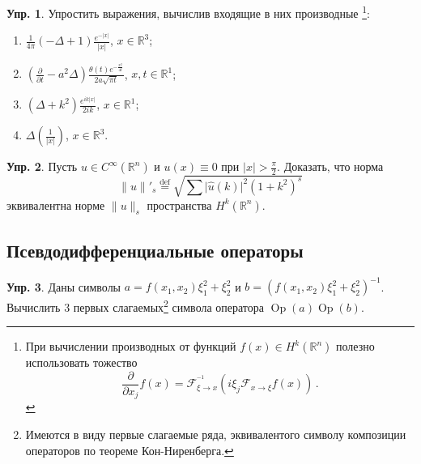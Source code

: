 \documentclass[a4paper, 12pt]{article}
\theoremstyle{definition}
\newtheorem{exercise}{Упр.}
\begin{document}
\begin{exercise} %
    Упростить выражения, вычислив входящие в них производные
    \footnote{При вычислении производных от функций \({ f(x) \in H^{k}(\mathbb R^{n}) }\) полезно использовать тожество \[
        \frac{\partial}{\partial x_j} f(x) = \mathcal F^{^{-1}}_{\xi \to x} (i\xi_{j} \mathcal F_{x \to \xi}f(x))\,.
    \]}:
    \begin{enumerate}
        \item \({ \displaystyle \frac{1}{4\pi} (- \Delta + 1) \frac{e^{-\lvert x \rvert}}{\lvert x \rvert} }\), \({ x \in \mathbb R^3 }\); \\
        \item \({ \displaystyle \left( \frac{\partial}{\partial t} - a^2 \Delta \right) \frac{\theta(t) e^{-\frac{x^2}{4t}}}{2a \sqrt{\pi t}} }\), \({ x, t \in \mathbb R^{1} }\); \\
        \item \({ \displaystyle (\Delta + k^2) \frac{e^{ik \lvert x \rvert}}{2ik} }\), \({ x \in \mathbb R^{1} }\);
        \item \({ \displaystyle \Delta\left( \frac{1}{\lvert x \rvert} \right) }\), \({ x \in \mathbb R^3 }\).
    \end{enumerate}
\end{exercise}

\begin{exercise}
    Пусть \({ u \in C^{\infty}(\mathbb R^{n}) }\) и \({ u(x) \equiv 0 }\) при \({ \lvert x \rvert > \frac{\pi}{2} }\).
    Доказать, что норма \[
        \lVert u \rVert'_{s} \overset{\text{def}}= \sqrt{\sum \lvert \hat{u}(k) \rvert^2 (1 + k^2)^{s}}
    \] эквивалентна норме \({ \lVert u \rVert_{s} }\) пространства \({ H^{k}(\mathbb R^{n}) }\).
\end{exercise}

\subsection{Псевдодифференциальные операторы} %

\begin{exercise}
    Даны символы \({ a = f(x_1, x_2) \xi_1^2 + \xi_2^2 }\) и \({ b = \left( f(x_1, x_2) \xi_1^2 + \xi_2^2 \right)^{-1} }\). Вычислить \({ 3 }\) первых слагаемых\footnote{Имеются в виду первые слагаемые ряда, эквивалентого символу композиции операторов по теореме Кон-Ниренберга.} символа оператора \({ \operatorname{Op}(a) \operatorname{Op}(b) }\).
\end{exercise}
\end{document}
